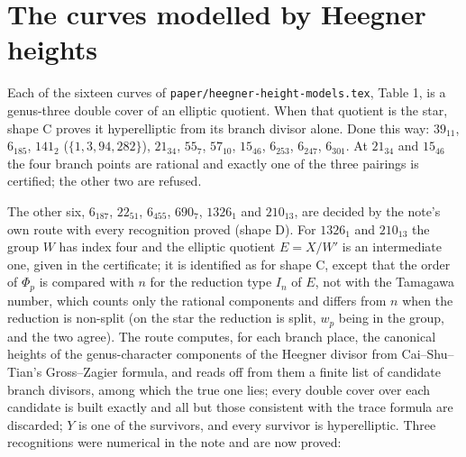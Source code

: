 \documentclass[11pt,reqno]{amsart}
\theoremstyle{plain}
\theoremstyle{definition}
\begin{document}
\section{The curves modelled by Heegner heights}

Each of the sixteen curves of \texttt{paper/heegner-height-models.tex}, Table 1, is a genus-three double cover of
an elliptic quotient. When that quotient is the star, shape C proves it hyperelliptic from its branch divisor
alone. Done this way: $39_{11}$, $6_{185}$, $141_2$ ($\{1,3,94,282\}$), $21_{34}$, $55_7$, $57_{10}$, $15_{46}$,
$6_{253}$, $6_{247}$, $6_{301}$. At $21_{34}$ and $15_{46}$ the four branch points are rational and exactly one of
the three pairings is certified; the other two are refused.

The other six, $6_{187}$, $22_{51}$, $6_{455}$, $690_7$, $1326_1$ and $210_{13}$, are decided by the note's own route
with every recognition proved (shape D). For $1326_1$ and $210_{13}$ the group $W$ has index four and the
elliptic quotient $E=X/W'$ is an intermediate one, given in the certificate; it is identified as for shape C,
except that the order of $\Phi_p$ is compared with $n$ for the reduction type $I_n$ of $E$, not with the Tamagawa
number, which counts only the rational components and differs from $n$ when the reduction is non-split (on
the star the reduction is split, $w_p$ being in the group, and the two agree). The route computes, for each
branch place, the canonical heights of the genus-character components of the Heegner divisor from Cai--Shu--Tian's
Gross--Zagier formula, and reads off from them a finite list of candidate branch divisors, among which the
true one lies; every double cover over each candidate is built exactly and all but those consistent with the
trace formula are discarded; $Y$ is one of the survivors, and every survivor is hyperelliptic. Three
recognitions were numerical in the note and are now proved:
\end{document}
